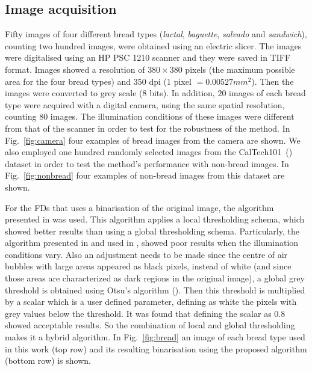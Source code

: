 \documentclass[oneside,a4paper,english,links]{amca}
\begin{document}
\subsection{Image acquisition}
Fifty images of four different bread types ({\em lactal}, {\em baguette}, {\em salvado} and {\em sandwich}), counting two hundred images, were obtained using an electric slicer. The images were digitalised using an HP PSC 1210 scanner and they were saved in TIFF format. Images showed a resolution of $380 \times 380$ pixels (the maximum possible area for the four bread types) and $350$ dpi ($1$ pixel $= 0.00527 mm^{2}$). Then the images were converted to grey scale ($8$ bits). In addition, $20$ images of each bread type were acquired with a digital camera, using the same spatial resolution, counting $80$ images. The illumination conditions of these images were different from that of the scanner in order to test for the robustness of the method. In Fig.~\ref{fig:camera} four examples of bread images from the camera are shown. We also employed one hundred randomly selected images from the CalTech101~(\cite{FeiFei04}) dataset in order to test the method's performance with non-bread images. In Fig.~\ref{fig:nonbread} four examples of non-bread images from this dataset are shown. 

For the FDs that uses a binarisation of the original image, the algorithm presented in \cite{White83} was used. This algorithm applies a local thresholding schema, which showed better results than using a global thresholding schema. Particularly, the algorithm presented in \cite{Huang95} and used in \cite{Gonzales2008}, showed poor results when the illumination conditions vary. Also an adjustment needs to be made since the centre of air bubbles with large areas appeared as black pixels, instead of white (and since those areas are characterized as dark regions in the original image), a global grey threshold is obtained using Otsu's algorithm (\cite{Otsu79}). Then this threshold is multiplied by a scalar which is a user defined parameter, defining as white the pixels with grey values below the threshold. It was found that defining the scalar as $0.8$ showed acceptable results. So the combination of local and global thresholding makes it a hybrid algorithm. In Fig.~\ref{fig:bread} an image of each bread type used in this work (top row) and its resulting binarisation using the proposed algorithm (bottom row) is shown.  
\end{document}
